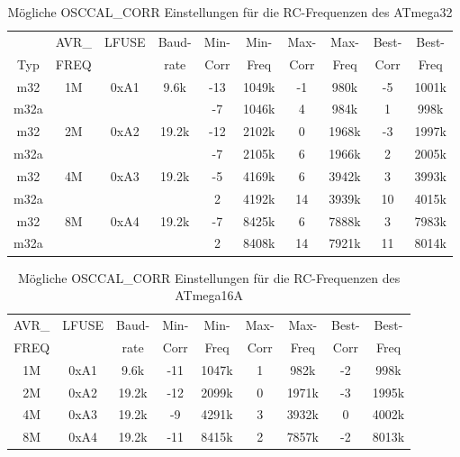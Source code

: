 \begin{table}[H]
  \begin{center}
    \begin{tabular}{| c | c | c | c || c | c || c | c || c | c |}
    \hline
        &     AVR\_ & LFUSE & Baud- & Min- & Min- & Max- & Max- & Best- & Best-  \\
 Typ    &     FREQ  &       & rate & Corr & Freq & Corr & Freq  & Corr  & Freq  \\
    \hline
    \hline
m32  &       1M    & 0xA1  &  9.6k &  -13  & 1049k & -1  & 980k  & -5  & 1001k \\
m32a &             &       &       &  -7  & 1046k &  4  & 984k  & 1  & 998k \\
    \hline
m32  &       2M    & 0xA2  & 19.2k &  -12  & 2102k &  0  & 1968k & -3  & 1997k \\
m32a &             &       &       &  -7  & 2105k &  6  & 1966k & 2  & 2005k \\
    \hline
m32  &       4M    & 0xA3  & 19.2k &  -5  & 4169k & 6  & 3942k & 3  & 3993k \\
m32a &             &       &       &   2  & 4192k & 14  & 3939k & 10  & 4015k \\
    \hline
m32  &       8M    & 0xA4  & 19.2k &  -7  & 8425k &  6  & 7888k & 3  & 7983k \\
m32a &             &       &       &   2  & 8408k & 14  & 7921k & 11  & 8014k \\
    \hline
    \end{tabular}
  \end{center}
  \caption{Mögliche OSCCAL\_CORR Einstellungen für die RC-Frequenzen des ATmega32}
  \label{tab:mega32freq}
\end{table}

\begin{table}[H]
  \begin{center}
    \begin{tabular}{| c | c | c || c | c || c | c || c | c |}
    \hline
             AVR\_ & LFUSE & Baud- & Min- & Min- & Max- & Max- & Best- & Best-  \\
             FREQ  &       & rate & Corr & Freq & Corr & Freq  & Corr  & Freq  \\
    \hline
    \hline
                1M & 0xA1  &  9.6k &  -11  & 1047k &  1  & 982k  & -2  & 998k \\
    \hline
                2M & 0xA2  & 19.2k &  -12  & 2099k &  0  & 1971k & -3 & 1995k \\
    \hline
                4M & 0xA3  & 19.2k &  -9  & 4291k &  3  & 3932k & 0  & 4002k \\
    \hline
                8M & 0xA4  & 19.2k &  -11 & 8415k & 2  & 7857k & -2  & 8013k \\
    \hline
    \end{tabular}
  \end{center}
  \caption{Mögliche OSCCAL\_CORR Einstellungen für die RC-Frequenzen des ATmega16A}
  \label{tab:mega16freq}
\end{table}

